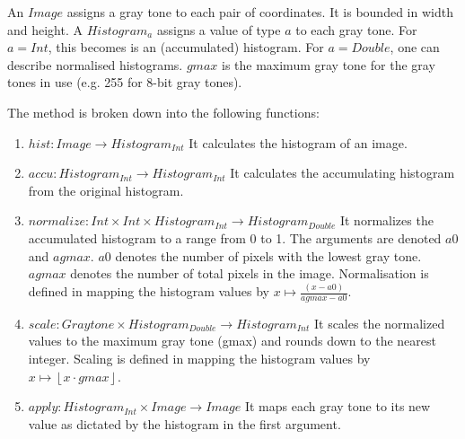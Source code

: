     An $Image$ assigns a gray tone to each pair of coordinates. It is bounded in width and height.
    A $Histogram_a$ assigns a value of type $a$ to each gray tone. For $a = Int$,
    this becomes is an (accumulated) histogram. For $a = Double$, one can
    describe normalised histograms.
    $gmax$ is the maximum gray tone for the gray tones in use (e.g. 255 for 8-bit gray tones).
    
    The method is broken down into the following functions:
      
    \begin{enumerate}
      \item $hist: Image \rightarrow Histogram_{Int}$ \newline
        It calculates the histogram of an image.
      \item $accu: Histogram_{Int} \rightarrow Histogram_{Int}$ \newline
        It calculates the accumulating histogram from the original histogram.
      \item $normalize: Int \times Int \times Histogram_{Int} \rightarrow Histogram_{Double}$  \newline
        It normalizes the accumulated histogram
        to a range from 0 to 1.
        The arguments are denoted $a0$ and $agmax$.
        $a0$ denotes the number of pixels with the lowest gray tone.
        $agmax$ denotes the number of total pixels in the image.
        Normalisation is defined in mapping the histogram values by $x \mapsto \frac{(x - a0)}{agmax - a0}$.
      \item $scale: Graytone \times Histogram_{Double} \rightarrow Histogram_{Int}$  \newline
        It scales the normalized values to the maximum gray tone (gmax) and rounds down to the nearest integer.
        Scaling is defined in mapping the histogram values by $x \mapsto \left \lfloor{x \cdot gmax}\right \rfloor $.
      \item $apply: Histogram_{Int} \times Image \rightarrow Image$  \newline
        It maps each gray tone to its new value as dictated by the histogram in the first argument.
    \end{enumerate}
      
